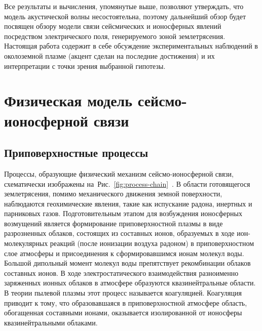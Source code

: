 \documentclass[12pt, oneside, a4paper]{article}
\begin{document}
Все результаты и вычисления, упомянутые выше, позволяют утверждать, что модель акустической волны несостоятельна, поэтому дальнейший обзор будет посвящен обзору модели связи сейсмических и ионосферных явлений посредством электрического поля, генерируемого зоной землетрясения. Настоящая работа содержит в себе обсуждение экспериментальных наблюдений в околоземной плазме (акцент сделан на последние достижения) и их интерпретации с точки зрения выбранной гипотезы.

\section{Физическая модель сейсмо-ионосферной связи}
\subsection{Приповерхностные процессы}
Процессы, образующие физический механизм сейсмо-ионосферной связи, схематически изображены на~\mbox{Рис. \ref{fig:process-chain}}~\cite{Pulinets_Boyarchuk:2004}. В области готовящегося землетрясения, помимо механического движения земной поверхности, наблюдаются геохимические явления, такие как испускание радона, инертных и парниковых газов. Подготовительным этапом для возбуждения ионосферных возмущений является формирование приповерхностной плазмы в виде разрозненных облаков, состоящих из составных ионов, образуемых в ходе ион-молекулярных реакций (после ионизации воздуха радоном) в приповерхностном слое атмосферы и присоединения к сформировавшимся ионам молекул воды. Большой дипольный момент молекул воды препятствует рекомбинации облаков составных ионов. В ходе электростатического взаимодействия разноименно заряженных ионных облаков в атмосфере образуются квазинейтральные области. В теории пылевой плазмы этот процесс называется коагуляцией. Коагуляция приводит к тому, что образовавшаяся в приповерхностной атмосфере область, обогащенная составными ионами, оказывается изолированной от ионосферы квазинейтральными облаками.
\end{document}
